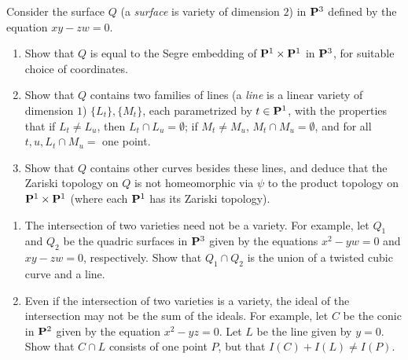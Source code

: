 \documentclass[10pt]{amsart}
\begin{document}
\begin{exercise}[2.15]
    Consider the surface $Q$ (a \emph{surface} is variety of dimension $2$) in
    ${\bf P}^3$ defined by the equation $xy-zw = 0$.
    \begin{enumerate} 
      \item Show that $Q$ is equal to the Segre embedding of ${\bf P}^1 \times {\bf P}^1$ in
        ${\bf P}^3$, for suitable choice of coordinates.
      \item Show that $Q$ contains two families of lines (a \emph{line} is a
        linear variety of dimension $1$) $\{L_t\}, \{M_t\}$, each parametrized by
        $t \in {\bf P}^1$, with the properties that if $L_t \ne L_u$, then
        $L_t \cap L_u = \emptyset$; if $M_t \ne M_u$, $M_t \cap M_u = \emptyset$,
        and for all $t,u, L_t \cap M_u =$ one point. 
      \item Show that $Q$ contains other curves besides these lines, and deduce that
        the Zariski topology on $Q$ is not homeomorphic via $\psi$ to the product
        topology on ${\bf P}^1 \times {\bf P}^1$ (where each ${\bf P}^1$ has its Zariski
        topology). 
    \end{enumerate}
\end{exercise}

\begin{solution}
    
\end{solution}

\begin{exercise}[2.16]
    \begin{enumerate}
        \item The intersection of two varieties need not be a variety. For example,
        let $Q_1$ and $Q_2$ be the quadric surfaces in ${\bf P}^3$ given by the
        equations $x^2-yw = 0$ and $xy - zw =0$, respectively. Show that $Q_1 \cap
        Q_2$ is the union of a twisted cubic curve and a line.
        
        \item Even if the intersection of two varieties is a variety, the ideal of the
        intersection may not be the sum of the ideals. For example, let $C$ be the
        conic in ${\bf P}^2$ given by the equation $x^2-yz = 0$. Let $L$ be the line
        given by $y = 0$. Show that $C \cap L$ consists of one point $P$, but that
        $I(C) + I(L) \ne I(P)$. 
    \end{enumerate}
\end{exercise}

\begin{solution}
    
\end{solution}
\end{document}
